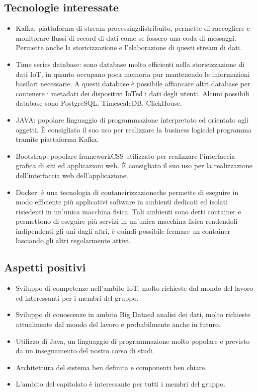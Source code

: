 \subsection{Tecnologie interessate}
\begin{itemize}
	\item Kafka\glosp: piattaforma di stream-processing\glosp distribuito, permette di raccogliere e monitorare flussi di record di dati come se fossero una coda di messaggi. Permette anche la storicizzazione e l'elaborazione di questi stream di dati.	
	\item Time series database\glosp: sono database molto efficienti nella storicizzazione di dati IoT\glo, in quanto occupano poca memoria pur mantenendo le informazioni basilari necessarie. A questi database è possibile affiancare altri database per contenere i metadati dei dispositivi IoT\glosp ed i dati degli utenti. Alcuni possibili database sono PostgreSQL\glo, TimescaleDB\glo, ClickHouse\glo.
	\item JAVA\glosp: popolare linguaggio di programmazione interpretato ed orientato agli oggetti. È consigliato il suo uso per realizzare la business logic\glosp del programma tramite piattaforma Kafka\glo.
	\item Bootstrap\glosp: popolare framework\glosp CSS utilizzato per realizzare l'interfaccia grafica di siti ed applicazioni web. È consigliato il suo uso per la realizzazione dell'interfaccia web dell'applicazione.
	\item Docker\glosp: è una tecnologia di contaneirizzazione\glosp che permette di eseguire in modo efficiente più applicativi software in ambienti dedicati ed isolati risiedenti in un'unica macchina fisica. Tali ambienti sono detti container e permettono di eseguire più servizi in un'unica macchina fisica rendendoli indipendenti gli uni dagli altri, è quindi possibile fermare un container lasciando gli altri regolarmente attivi.
\end{itemize} 
\subsection{Aspetti positivi}
\begin{itemize} 
	\item Sviluppo di competenze nell'ambito IoT\glo, molto richieste dal mondo del lavoro ed interessanti per i membri del gruppo.
	\item Sviluppo di conoscenze in ambito Big Data\glosp ed analisi dei dati, molto richieste attualmente dal mondo del lavoro e probabilmente anche in futuro.
	\item Utilizzo di Java, un linguaggio di programmazione molto popolare e previsto da un insegnamento del nostro corso di studi.
	\item Architettura del sistema ben definita e componenti ben chiare.
	\item L'ambito del capitolato è interessante per tutti i membri del gruppo.
\end{itemize}
